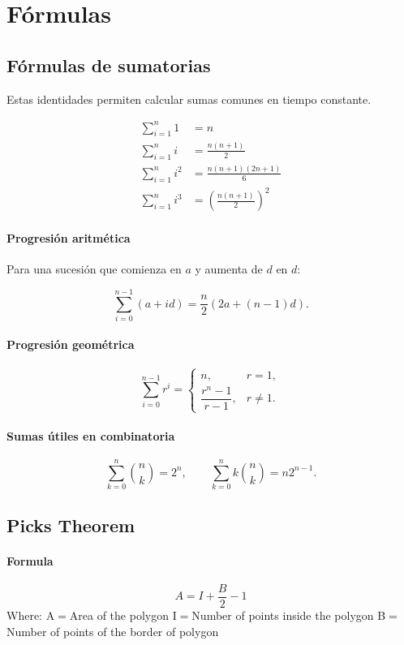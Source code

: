 \section{Fórmulas}
\subsection{Fórmulas de sumatorias}

Estas identidades permiten calcular sumas comunes en tiempo constante.

\[
\begin{aligned}
\sum_{i=1}^{n} 1
    &= n \\[4pt]
\sum_{i=1}^{n} i
    &= \frac{n(n+1)}{2} \\[4pt]
\sum_{i=1}^{n} i^2
    &= \frac{n(n+1)(2n+1)}{6} \\[4pt]
\sum_{i=1}^{n} i^3
    &= \left(\frac{n(n+1)}{2}\right)^2
\end{aligned}
\]

\paragraph{Progresión aritmética}
Para una sucesión que comienza en $a$ y aumenta de $d$ en $d$:

\[
\sum_{i=0}^{n-1}(a+id)
= \frac{n}{2}\left(2a+(n-1)d\right).
\]

\paragraph{Progresión geométrica}
\[
\sum_{i=0}^{n-1} r^i =
\begin{cases}
n, & r=1,\\[4pt]
\dfrac{r^n-1}{r-1}, & r\ne 1.
\end{cases}
\]

\paragraph{Sumas útiles en combinatoria}
\[
\sum_{k=0}^{n}\binom{n}{k}=2^n,
\qquad
\sum_{k=0}^{n}k\binom{n}{k}=n2^{n-1}.
\]

\subsection{Picks Theorem}
\paragraph{Formula}
\[
    {A=I}+\dfrac{B}{2}-1
\]
    Where:\newline
    A$=$Area of the polygon\newline
    I$=$Number of points inside the polygon\newline
    B$=$Number of points of the border of polygon\newline
